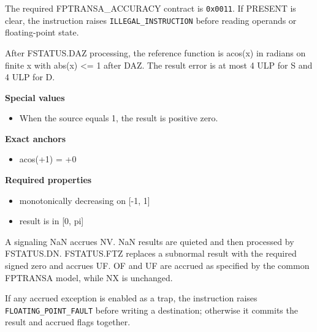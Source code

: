 The required FPTRANSA\_ACCURACY contract is \texttt{0x0011}. If PRESENT is clear, the instruction raises \texttt{ILLEGAL\_INSTRUCTION} before reading operands or floating-point state.

After FSTATUS.DAZ processing, the reference function is acos(x) in radians on finite x with abs(x) \textless{}= 1 after DAZ. The result error is at most 4 ULP for S and 4 ULP for D.

\textbf{Special values}\par
\begin{itemize}
\item When the source equals 1, the result is positive zero.
\end{itemize}

\textbf{Exact anchors}\par
\begin{itemize}
\item acos(+1) = +0
\end{itemize}

\textbf{Required properties}\par
\begin{itemize}
\item monotonically decreasing on [-1, 1]
\item result is in [0, pi]
\end{itemize}

A signaling NaN accrues NV. NaN results are quieted and then processed by FSTATUS.DN. FSTATUS.FTZ replaces a subnormal result with the required signed zero and accrues UF. OF and UF are accrued as specified by the common FPTRANSA model, while NX is unchanged.

If any accrued exception is enabled as a trap, the instruction raises \texttt{FLOATING\_POINT\_FAULT} before writing a destination; otherwise it commits the result and accrued flags together.
